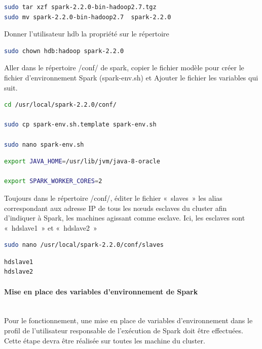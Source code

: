 \documentclass[12pt,english]{book}
\begin{document}
\begin{lstlisting}[language=bash, frame=single]
sudo tar xzf spark-2.2.0-bin-hadoop2.7.tgz 
sudo mv spark-2.2.0-bin-hadoop2.7  spark-2.2.0
\end{lstlisting}

Donner l’utilisateur hdb la propriété sur le répertoire

\begin{lstlisting}[language=bash, frame=single]
sudo chown hdb:hadoop spark-2.2.0
\end{lstlisting}

Aller dans le répertoire /conf/ de spark, copier le fichier modèle pour créer le fichier d’environnement Spark (spark-env.sh) et Ajouter le fichier les variables qui suit.

\begin{lstlisting}[language=bash, frame=single]
cd /usr/local/spark-2.2.0/conf/

sudo cp spark-env.sh.template spark-env.sh

sudo nano spark-env.sh
\end{lstlisting}

\begin{lstlisting}[language=bash, frame=single]
export JAVA_HOME=/usr/lib/jvm/java-8-oracle

export SPARK_WORKER_CORES=2
\end{lstlisting}

Toujours dans le répertoire /conf/, éditer le fichier « slaves » les alias correspondant aux adresse IP de tous les nœuds esclaves du cluster afin d’indiquer à Spark, les machines agissant comme esclave.
Ici, les esclaves sont « hdslave1 » et « hdslave2 »

\begin{lstlisting}[language=bash, frame=single]
sudo nano /usr/local/spark-2.2.0/conf/slaves
\end{lstlisting}

\begin{lstlisting}[language=bash, frame=single]
hdslave1
hdslave2
\end{lstlisting}

\paragraph{Mise en place des variables d’environnement de Spark}\mbox{}\\

Pour le fonctionnement, une mise en place de variables d’environnement dans le profil de l’utilisateur responsable de l’exécution de Spark doit être effectuées.
Cette étape devra être réalisée sur toutes les machine du cluster.
\end{document}
